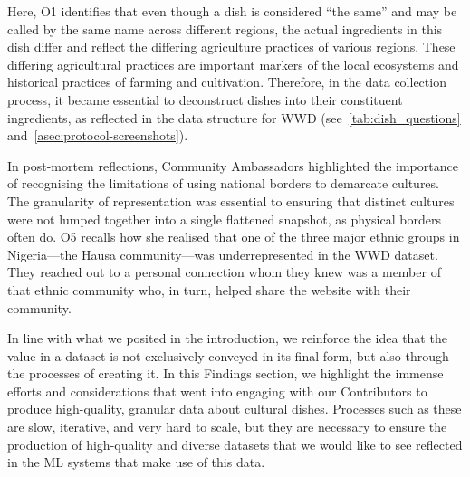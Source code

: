 Here, O1 identifies that even though a dish is considered ``the same'' and may be called by the same name across different regions, the actual ingredients in this dish differ and reflect the differing agriculture practices of various regions. These differing agricultural practices are important markers of the local ecosystems and historical practices of farming and cultivation. Therefore, in the data collection process, it became essential to deconstruct dishes into their constituent ingredients, as reflected in the data structure for \textsc{WWD} (see~\cref{tab:dish_questions} and~\cref{asec:protocol-screenshots}). 


In post-mortem reflections, Community Ambassadors highlighted the importance of recognising the limitations of using national borders to demarcate cultures. The granularity of representation was essential to ensuring that distinct cultures were not lumped together into a single flattened snapshot, as physical borders often do. O5 recalls how she realised that one of the three major ethnic groups in Nigeria---the Hausa community---was underrepresented in the \textsc{WWD} dataset. They reached out to a personal connection whom they knew was a member of that ethnic community who, in turn, helped share the website with their community. 


In line with what we posited in the introduction, we reinforce the idea that the value in a dataset is not exclusively conveyed in its final form, but also through the processes of creating it. In this Findings section, we highlight the immense efforts and considerations that went into engaging with our Contributors to produce high-quality, granular data about cultural dishes. Processes such as these are slow, iterative, and very hard to scale, but they are necessary to ensure the production of high-quality and diverse datasets that we would like to see reflected in the ML systems that make use of this data. 




 






